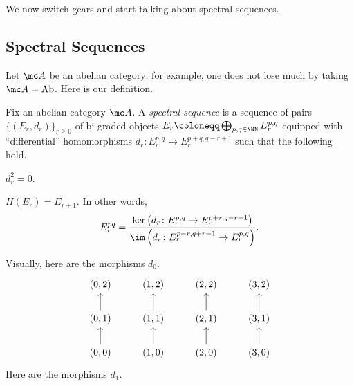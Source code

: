 \documentclass[../notes.tex]{subfiles}
\begin{document}
We now switch gears and start talking about spectral sequences.

\subsection{Spectral Sequences}
Let $\mc A$ be an abelian category; for example, one does not lose much by taking $\mc A=\mathrm{Ab}$. Here is our definition.
\begin{definition}
	Fix an abelian category $\mc A$. A \textit{spectral sequence} is a sequence of pairs $\{(E_r,d_r)\}_{r\ge0}$ of bi-graded objects $E_r\coloneqq\bigoplus_{p,q\in\NN}E_r^{p,q}$ equipped with ``differential'' homomorphisms $d_r\colon E_r^{p,q}\to E_r^{p+q,q-r+1}$ such that the following hold.
	\begin{listalph}
		\item $d_r^2=0$.
		\item $H(E_r)=E_{r+1}$. In other words,
		\[E_r^{pq}=\frac{\ker\left(d_r\colon E_r^{p,q}\to E_r^{p+r,q-r+1}\right)}{\im\left( d_r\colon E_r^{p-r,q+r-1}\to E_r^{p,q}\right)}.\]
	\end{listalph}
\end{definition}
Visually, here are the morphisms $d_0$.
\[\begin{tikzcd}
	{(0,2)} & {(1,2)} & {(2,2)} & {(3,2)} \\
	{(0,1)} & {(1,1)} & {(2,1)} & {(3,1)} \\
	{(0,0)} & {(1,0)} & {(2,0)} & {(3,0)}
	\arrow[from=2-1, to=1-1]
	\arrow[from=2-2, to=1-2]
	\arrow[from=2-3, to=1-3]
	\arrow[from=2-4, to=1-4]
	\arrow[from=3-1, to=2-1]
	\arrow[from=3-2, to=2-2]
	\arrow[from=3-3, to=2-3]
	\arrow[from=3-4, to=2-4]
\end{tikzcd}\]
Here are the morphisms $d_1$.
\end{document}
